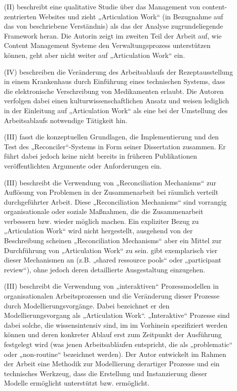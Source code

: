 \begin{description}
	\item[\citet{Eschenfelder03}] (II) beschreibt eine qualitative Studie über das Management von content-zentrierten Websites und zieht „Articulation Work“ (in Bezugnahme auf das von \citet{Corbin93} beschriebene Verständnis) als das der Analyse zugrundeliegende Framework heran. Die Autorin zeigt im zweiten Teil der Arbeit auf, wie Content Management Systeme den Verwaltungsprozess unterstützen können, geht aber nicht weiter auf „Articulation Work“ ein.
	\item[\citet{Olesen03}] (IV) beschreiben die Veränderung des Arbeitsablaufs der Rezeptausstellung in einem Krankenhaus durch Einführung eines technischen Systems, dass die elektronische Verschreibung von Medikamenten erlaubt. Die Autoren verfolgen dabei einen kulturwissenschaftlichen Ansatz und weisen lediglich in der Einleitung auf „Articulation Work“ als eine bei der Umstellung des Arbeitsablaufs notwendige Tätigkeit hin.
	\item[\citet{Sarini03}] (III) fasst die konzeptuellen Grundlagen, die Implementierung und den Test des „Reconciler“-Systems in Form seiner Dissertation zusammen. Er führt dabei jedoch keine nicht bereits in früheren Publikationen veröffentlichten Argumente oder Anforderungen ein.
	\item[\citet{Gerson04}] (III) beschreibt die Verwendung von „Reconciliation Mechanisms“ zur Auflösung von Problemen in der Zusammenarbeit bei räumlich verteilt durchgeführter Arbeit. Diese „Reconciliation Mechanisms“ sind vorrangig organisationale oder soziale Maßnahmen, die die Zusammenarbeit verbessern bzw. wieder möglich machen. Ein expliziter Bezug zu „Articulation Work“ wird nicht hergestellt, ausgehend von der Beschreibung scheinen „Reconciliation Mechanisms“ aber ein Mittel zur Durchführung von „Articulation Work“ zu sein. \citeauthor{Gerson04} gibt exemplarisch vier dieser Mechanismen an (z.B. „shared ressource pools“ oder „participant review“), ohne jedoch deren detaillierte Ausgestaltung einzugehen.
	\item[\citet{Jorgensen04}] (III) beschreibt die Verwendung von „interaktiven“ Prozessmodellen in organisationalen Arbeitsprozessen und die Veränderung dieser Prozesse durch Modellierungsvorgänge. Dabei bezeichnet er den Modellierungsvorgang als „Articulation Work“. „Interaktive“ Prozesse sind dabei solche, die wissensintensiv sind, im im Vorhinein spezifiziert werden können und deren konkreter Ablauf erst zum Zeitpunkt der Ausführung festgelegt wird (was jenen Arbeitsabläufen entspricht, die als „problematic“ oder „non-routine“ bezeichnet werden). Der Autor entwickelt im Rahmen der Arbeit eine Methodik zur Modellierung derartiger Prozesse und ein technisches Werkzeug, dass die Erstellung und Instanzierung dieser Modelle ermöglicht unterstützt bzw. ermöglicht.

\end{description}

